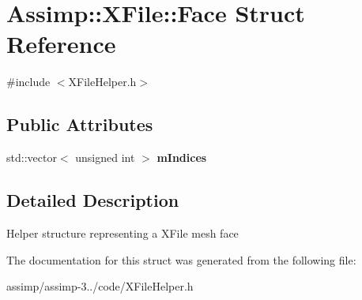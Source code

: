 \hypertarget{struct_assimp_1_1_x_file_1_1_face}{\section{Assimp\+:\+:X\+File\+:\+:Face Struct Reference}
\label{struct_assimp_1_1_x_file_1_1_face}
}


{\ttfamily \#include $<$X\+File\+Helper.\+h$>$}

\subsection*{Public Attributes}
\begin{DoxyCompactItemize}
\item 
\hypertarget{struct_assimp_1_1_x_file_1_1_face_a714157315314142bb6201d0b5ce87250}{std\+::vector$<$ unsigned int $>$ {\bfseries m\+Indices}}\label{struct_assimp_1_1_x_file_1_1_face_a714157315314142bb6201d0b5ce87250}

\end{DoxyCompactItemize}


\subsection{Detailed Description}
Helper structure representing a X\+File mesh face 

The documentation for this struct was generated from the following file\+:\begin{DoxyCompactItemize}
\item 
assimp/assimp-\/3../code/X\+File\+Helper.\+h\end{DoxyCompactItemize}
